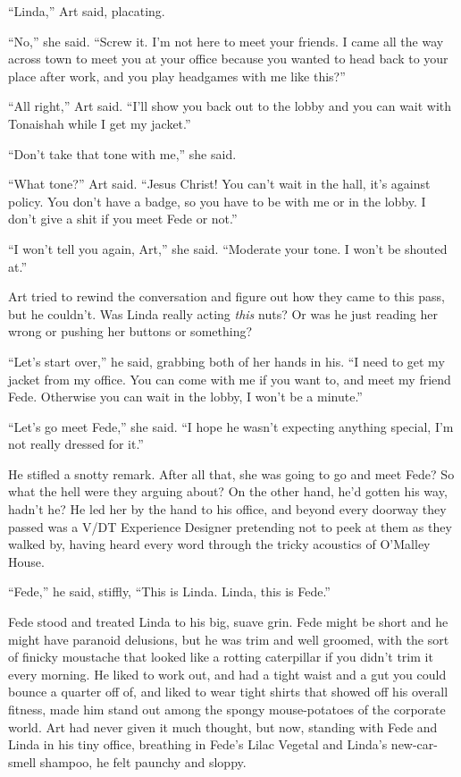 “Linda,” Art said, placating.

“No,” she said. “Screw it. I’m not here to meet your friends. I
came all the way across town to meet you at your office because you
wanted to head back to your place after work, and you play
headgames with me like this?”

“All right,” Art said. “I’ll show you back out to the lobby and you
can wait with Tonaishah while I get my jacket.”

“Don’t take that tone with me,” she said.

“What tone?” Art said. “Jesus Christ! You can’t wait in the hall,
it’s against policy. You don’t have a badge, so you have to be with
me or in the lobby. I don’t give a shit if you meet Fede or not.”

“I won’t tell you again, Art,” she said. “Moderate your tone. I
won’t be shouted at.”

Art tried to rewind the conversation and figure out how they came
to this pass, but he couldn’t. Was Linda really acting \emph{this}
nuts? Or was he just reading her wrong or pushing her buttons or
something?

“Let’s start over,” he said, grabbing both of her hands in his. “I
need to get my jacket from my office. You can come with me if you
want to, and meet my friend Fede. Otherwise you can wait in the
lobby, I won’t be a minute.”

“Let’s go meet Fede,” she said. “I hope he wasn’t expecting
anything special, I’m not really dressed for it.”

He stifled a snotty remark. After all that, she was going to go and
meet Fede? So what the hell were they arguing about? On the other
hand, he’d gotten his way, hadn’t he? He led her by the hand to his
office, and beyond every doorway they passed was a V/DT Experience
Designer pretending not to peek at them as they walked by, having
heard every word through the tricky acoustics of O’Malley House.

“Fede,” he said, stiffly, “This is Linda. Linda, this is Fede.”

Fede stood and treated Linda to his big, suave grin. Fede might be
short and he might have paranoid delusions, but he was trim and
well groomed, with the sort of finicky moustache that looked like a
rotting caterpillar if you didn’t trim it every morning. He liked
to work out, and had a tight waist and a gut you could bounce a
quarter off of, and liked to wear tight shirts that showed off his
overall fitness, made him stand out among the spongy mouse-potatoes
of the corporate world. Art had never given it much thought, but
now, standing with Fede and Linda in his tiny office, breathing in
Fede’s Lilac Vegetal and Linda’s new-car-smell shampoo, he felt
paunchy and sloppy.

